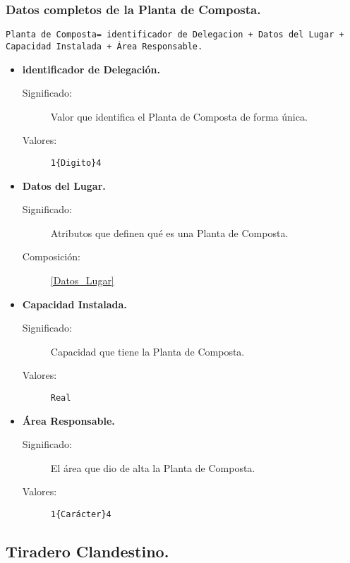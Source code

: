 \subsubsection{Datos completos de la Planta de Composta.}
\begin{lstlisting}
Planta de Composta= identificador de Delegacion + Datos del Lugar + Capacidad Instalada + Área Responsable.
\end{lstlisting}
	\begin{itemize}
		\item \textbf{identificador de Delegación.}
			\begin{description}
				\item [Significado:] Valor que identifica el Planta de Composta de forma única.
				\item [Valores:]{\begin{lstlisting}
1{Digito}4\end{lstlisting}}
			\end{description}
		\item \textbf{Datos del Lugar.}
			\begin{description}
				\item [Significado:] Atributos que definen qué es una Planta de Composta.
				\item [Composición:] \ref{Datos_Lugar}
			\end{description}
		\item \textbf{Capacidad Instalada.}
			\begin{description}
				\item [Significado:] Capacidad que tiene la Planta de Composta.
				\item [Valores:]{\begin{lstlisting}
Real\end{lstlisting}}
			\end{description}
		\item \textbf{Área Responsable.}
			\begin{description}
				\item [Significado:] El área que dio de alta la Planta de Composta.
				\item [Valores:]{\begin{lstlisting}
1{Carácter}4\end{lstlisting}}
			\end{description}
	\end{itemize}

\subsection{Tiradero Clandestino.}

